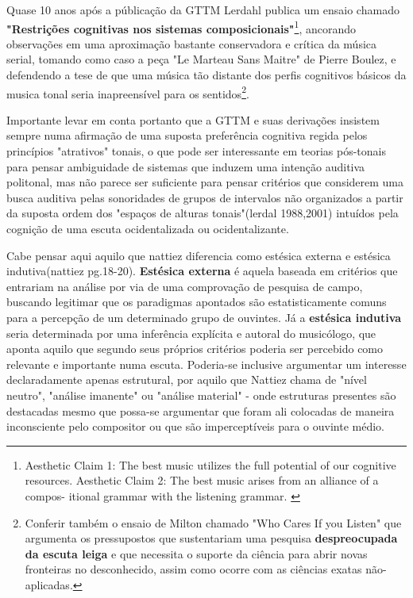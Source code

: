 \documentclass[
	12pt,				%
	openright,			%
	twoside,			%
	a4paper,			%
	english,			%
	french,				%
	spanish,			%
	brazil				%
	]{abntex2}
\begin{document}
Quase 10 anos após a públicação da GTTM Lerdahl publica um ensaio chamado \textbf{"Restrições cognitivas nos sistemas composicionais"}\cite{lerdahl1992cognitive}\footnote{
Aesthetic Claim 1: The best music utilizes the full potential of our
cognitive resources. Aesthetic Claim 2: The best music arises from an alliance of a compos-
itional grammar with the listening grammar. \cite{lerdahl1992cognitive}
}, ancorando observações em uma aproximação bastante conservadora e crítica da música serial, tomando como caso a peça "Le Marteau Sans Maitre" de Pierre Boulez, e defendendo a tese de que uma música tão distante dos perfis cognitivos básicos da musica tonal seria inapreensível para os sentidos\footnote{Conferir também o ensaio de Milton  chamado "Who Cares If you Listen" que argumenta os pressupostos que sustentariam uma pesquisa \textbf{despreocupada da escuta leiga} e que necessita o suporte da ciência para abrir novas fronteiras no desconhecido, assim como ocorre com as ciências exatas não-aplicadas. }. 

Importante levar em conta portanto que a GTTM e suas derivações insistem sempre numa afirmação de uma suposta preferência cognitiva regida pelos princípios "atrativos" tonais, o que pode ser interessante em teorias pós-tonais para pensar ambiguidade de sistemas que induzem uma intenção auditiva politonal, mas não parece ser suficiente para pensar critérios que considerem uma busca auditiva pelas sonoridades de grupos de intervalos não organizados a partir da suposta ordem dos "espaços de alturas tonais"(lerdal 1988,2001) intuídos pela cognição de uma escuta ocidentalizada ou ocidentalizante.

Cabe pensar aqui aquilo que nattiez diferencia como estésica externa e estésica indutiva(nattiez pg.18-20). \textbf{Estésica externa} é aquela baseada em critérios que entrariam na análise por via de uma comprovação de pesquisa de campo, buscando legitimar que os paradigmas apontados são estatisticamente comuns para a percepção de um determinado grupo de ouvintes. Já a \textbf{estésica indutiva} seria determinada por uma inferência explícita e autoral do musicólogo, que aponta aquilo que segundo seus próprios critérios poderia ser percebido como relevante e importante numa escuta. Poderia-se inclusive argumentar um interesse declaradamente apenas estrutural, por aquilo que Nattiez chama de "nível neutro", "análise imanente" ou "análise material" - onde estruturas presentes são destacadas mesmo que possa-se argumentar que foram ali colocadas de maneira inconsciente pelo compositor ou que são imperceptíveis para o ouvinte médio.
\end{document}
